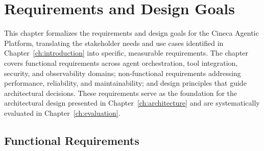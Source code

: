 \documentclass[a4paper,twoside]{sapthesis}
\begin{document}
\chapter{Requirements and Design Goals}
\label{ch:requirements}

%

This chapter formalizes the requirements and design goals for the Cineca Agentic Platform, translating the stakeholder needs and use cases identified in Chapter~\ref{ch:introduction} into specific, measurable requirements. The chapter covers functional requirements across agent orchestration, tool integration, security, and observability domains; non-functional requirements addressing performance, reliability, and maintainability; and design principles that guide architectural decisions. These requirements serve as the foundation for the architectural design presented in Chapter~\ref{ch:architecture} and are systematically evaluated in Chapter~\ref{ch:evaluation}.

\section{Functional Requirements}
\label{sec:functional-requirements}
\end{document}
